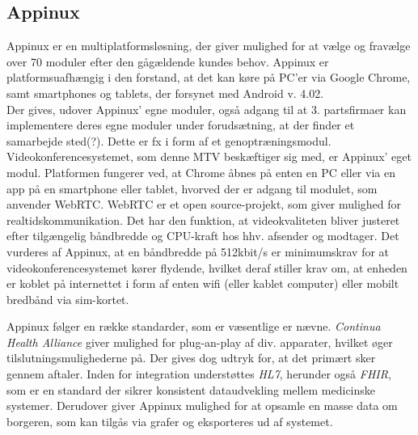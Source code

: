 \subsection{Appinux}
Appinux er en multiplatformsløsning, der giver mulighed for at vælge og fravælge over 70 moduler efter den gågældende kundes behov. Appinux er platformsuafhængig i den forstand, at det kan køre på PC'er via Google Chrome, samt  smartphones og tablets, der forsynet med Android v. 4.02.\\Der gives, udover Appinux' egne moduler, også adgang til at 3. partsfirmaer kan implementere deres egne moduler under forudsætning, at der finder et samarbejde sted(?). Dette er fx i form af et genoptræningsmodul.\\Videokonferencesystemet, som denne MTV beskæftiger sig med, er Appinux' eget modul. Platformen fungerer ved, at Chrome åbnes på enten en PC eller via en app på en smartphone eller tablet, hvorved der er adgang til modulet, som anvender WebRTC. WebRTC er et open source-projekt, som giver mulighed for realtidskommunikation. Det har den funktion, at videokvaliteten bliver justeret efter tilgængelig båndbredde og CPU-kraft hos hhv. afsender og modtager. Det vurderes af Appinux, at en båndbredde på 512kbit/s er minimumskrav for at videokonferencesystemet kører flydende, hvilket deraf stiller krav om, at enheden er koblet på internettet i form af enten wifi (eller kablet computer) eller mobilt bredbånd via sim-kortet.


Appinux følger en række standarder, som er væsentlige   er nævne. \textit{Continua Health Alliance} giver mulighed for plug-an-play af div. apparater, hvilket øger tilslutningsmulighederne på. Der gives dog udtryk for, at det primært sker gennem aftaler. Inden for integration understøttes \textit{HL7}, herunder også \textit{FHIR}, som er en standard der sikrer konsistent dataudvekling mellem medicinske systemer. Derudover giver Appinux mulighed for at opsamle en masse data om borgeren, som kan tilgås via grafer og eksporteres ud af systemet.


